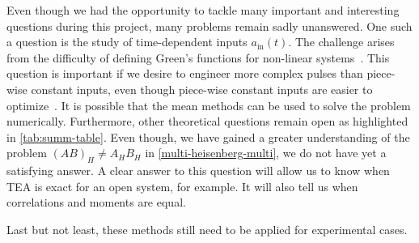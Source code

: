 Even though we had the opportunity to tackle many important and interesting questions during this project, many problems remain sadly unanswered. One such a question is the study of time-dependent inputs $a_{\text{in}}(t)$. The challenge arises from the difficulty of defining Green's functions for non-linear systems~\cite{non-lin-green, paper-off-non-lin-green}. This question is important if we desire to engineer more complex pulses than piece-wise constant inputs, even though piece-wise constant inputs are easier to optimize~\cite{emily}. It is possible that the mean methods can be used to solve the problem numerically. Furthermore, other theoretical questions remain open as highlighted in \autoref{tab:summ-table}. Even though, we have gained a greater understanding of the problem $(A B)_H \neq A_H B_H$ in \autoref{multi-heisenberg-multi}, we do not have yet a satisfying answer. A clear answer to this question will allow us to know when TEA is exact for an open system, for example. It will also tell us when correlations and moments are equal. 

Last but not least, these methods still need to be applied for experimental cases. 